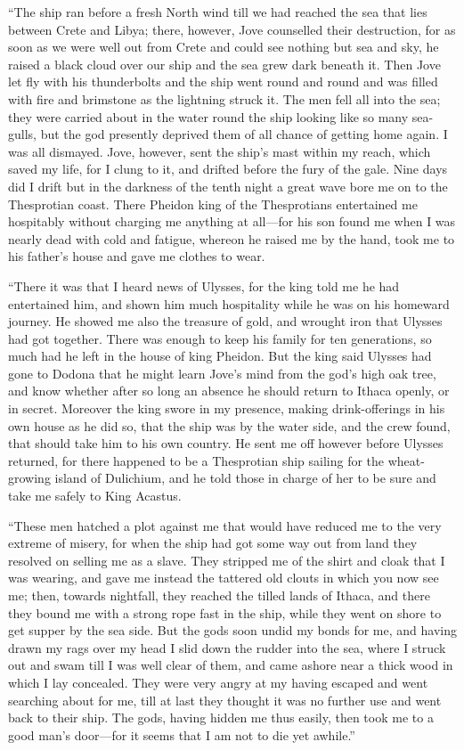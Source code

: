 “The ship ran before a fresh North wind till we had reached the sea that lies
between Crete and Libya; there, however, Jove counselled their destruction, for
as soon as we were well out from Crete and could see nothing but sea and sky,
he raised a black cloud over our ship and the sea grew dark beneath it. Then
Jove let fly with his thunderbolts and the ship went round and round and was
filled with fire and brimstone as the lightning struck it. The men fell all
into the sea; they were carried about in the water round the ship looking like
so many sea-gulls, but the god presently deprived them of all chance of getting
home again. I was all dismayed. Jove, however, sent the ship’s mast within my
reach, which saved my life, for I clung to it, and drifted before the fury of
the gale. Nine days did I drift but in the darkness of the tenth night a great
wave bore me on to the Thesprotian coast. There Pheidon king of the
Thesprotians entertained me hospitably without charging me anything at all—for
his son found me when I was nearly dead with cold and fatigue, whereon he
raised me by the hand, took me to his father’s house and gave me clothes to
wear.

“There it was that I heard news of Ulysses, for the king told me he had
entertained him, and shown him much hospitality while he was on his homeward
journey. He showed me also the treasure of gold, and wrought iron that Ulysses
had got together. There was enough to keep his family for ten generations, so
much had he left in the house of king Pheidon. But the king said Ulysses had
gone to Dodona that he might learn Jove’s mind from the god’s high oak tree,
and know whether after so long an absence he should return to Ithaca openly, or
in secret. Moreover the king swore in my presence, making drink-offerings in
his own house as he did so, that the ship was by the water side, and the crew
found, that should take him to his own country. He sent me off however before
Ulysses returned, for there happened to be a Thesprotian ship sailing for the
wheat-growing island of Dulichium, and he told those in charge of her to be
sure and take me safely to King Acastus.

“These men hatched a plot against me that would have reduced me to the very
extreme of misery, for when the ship had got some way out from land they
resolved on selling me as a slave. They stripped me of the shirt and cloak that
I was wearing, and gave me instead the tattered old clouts in which you now see
me; then, towards nightfall, they reached the tilled lands of Ithaca, and there
they bound me with a strong rope fast in the ship, while they went on shore to
get supper by the sea side. But the gods soon undid my bonds for me, and having
drawn my rags over my head I slid down the rudder into the sea, where I struck
out and swam till I was well clear of them, and came ashore near a thick wood
in which I lay concealed. They were very angry at my having escaped and went
searching about for me, till at last they thought it was no further use and
went back to their ship. The gods, having hidden me thus easily, then took me
to a good man’s door—for it seems that I am not to die yet awhile.”


